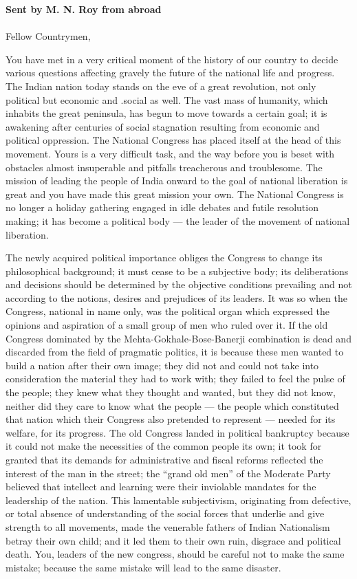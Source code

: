 \textbf{Sent by M. N. Roy from abroad}\\
\\

\noindent Fellow Countrymen, 

You have met in a very critical moment of the history of our country to decide various questions affecting gravely the future of the national life and progress. The Indian nation today stands on the eve of a great revolution, not only political but economic and .social as well. The vast mass of humanity, which inhabits the great peninsula, has begun to move towards a certain goal; it is awakening after centuries of social stagnation resulting from economic and political oppression. The National Congress has placed itself at the head of this movement. Yours is a very difficult task, and the way before you is beset with obstacles almost insuperable and pitfalls treacherous and troublesome. The mission of leading the people of India onward to the goal of national liberation is great and you have made this great mission your own. The National Congress is no longer a holiday gathering engaged in idle debates and futile resolution making; it has become a political body — the leader of the movement of 
national liberation.

The newly acquired political importance obliges the Congress to change its philosophical background; it must cease to be a subjective body; its deliberations and decisions should be determined by the objective conditions prevailing and not according to the notions, desires and prejudices of its leaders. It was so when the Congress, national in name only, was the political organ which expressed the opinions and aspiration of a small group of men who ruled over it. If the old Congress dominated by the Mehta-Gokhale-Bose-Banerji combination is dead and discarded from the field of pragmatic politics, it is because these men wanted to build a nation after their own image; they did not and could not take into consideration the material they had to work with; they failed to feel the pulse of the people; they knew what they thought and wanted, but they did not know, neither did they care to know what the people — the people which constituted that nation which their Congress also pretended to represent — needed for its welfare, for its progress. The old Congress landed in political bankruptcy because it could not make the necessities of the common people its own; it took for granted that its demands for administrative and fiscal reforms reflected the interest of the man in the street; the “grand old men” of the Moderate Party believed that intellect and learning were their inviolable mandates for the leadership of the nation. This lamentable subjectivism, originating from defective, or total absence of understanding of the social forces that underlie and give strength to all movements, made the venerable fathers of Indian Nationalism betray their own child; and it led them to their own ruin, disgrace and political death. You, leaders of the new congress, should be careful not to make the same mistake; because the same mistake will lead to the same disaster. 

